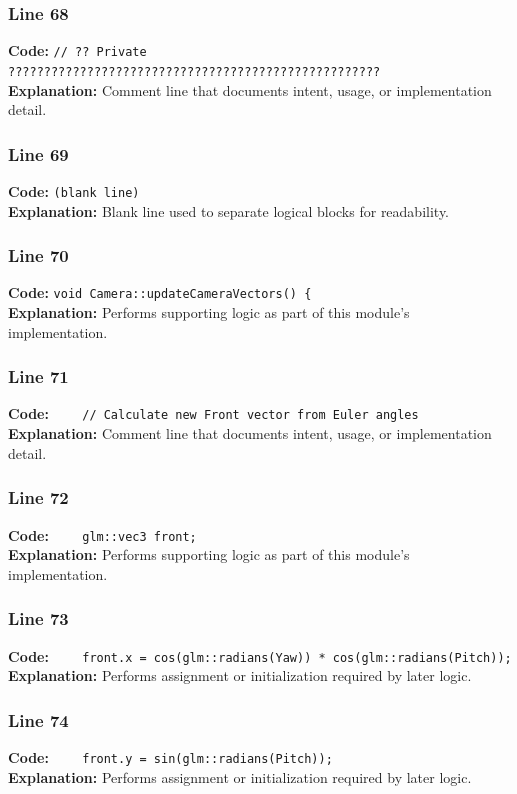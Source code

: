 \documentclass[11pt,a4paper]{article}
\begin{document}
\subsubsection*{Line 68}
\textbf{Code:} \verb|// ?? Private ????????????????????????????????????????????????????|\\
\textbf{Explanation:} Comment line that documents intent, usage, or implementation detail.

\subsubsection*{Line 69}
\textbf{Code:} \texttt{(blank line)}\\
\textbf{Explanation:} Blank line used to separate logical blocks for readability.

\subsubsection*{Line 70}
\textbf{Code:} \verb|void Camera::updateCameraVectors() {|\\
\textbf{Explanation:} Performs supporting logic as part of this module's implementation.

\subsubsection*{Line 71}
\textbf{Code:} \verb|    // Calculate new Front vector from Euler angles|\\
\textbf{Explanation:} Comment line that documents intent, usage, or implementation detail.

\subsubsection*{Line 72}
\textbf{Code:} \verb|    glm::vec3 front;|\\
\textbf{Explanation:} Performs supporting logic as part of this module's implementation.

\subsubsection*{Line 73}
\textbf{Code:} \verb|    front.x = cos(glm::radians(Yaw)) * cos(glm::radians(Pitch));|\\
\textbf{Explanation:} Performs assignment or initialization required by later logic.

\subsubsection*{Line 74}
\textbf{Code:} \verb|    front.y = sin(glm::radians(Pitch));|\\
\textbf{Explanation:} Performs assignment or initialization required by later logic.
\end{document}
